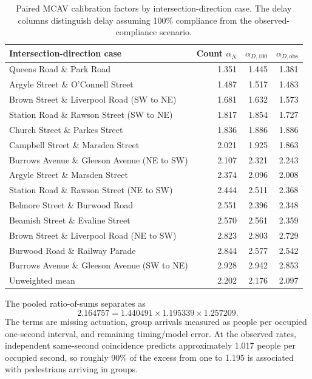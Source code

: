 \documentclass[11pt]{article}
\begin{document}
\begin{table}[htbp]
\centering
\caption{Paired MCAV calibration factors by intersection-direction case. The delay columns distinguish delay assuming 100\% compliance from the observed-compliance scenario.}
\label{tab:mcav-alpha-cases}
\footnotesize
\begin{tabular}{@{}lrrr@{}}
\toprule
Intersection-direction case & Count \(\alpha_N\) & \(\alpha_{D,100}\) & \(\alpha_{D,\mathrm{obs}}\) \\
\midrule
Queens Road \& Park Road & 1.351 & 1.445 & 1.381 \\
Argyle Street \& O'Connell Street & 1.487 & 1.517 & 1.483 \\
Brown Street \& Liverpool Road (SW to NE) & 1.681 & 1.632 & 1.573 \\
Station Road \& Rawson Street (SW to NE) & 1.817 & 1.854 & 1.727 \\
Church Street \& Parkes Street & 1.836 & 1.886 & 1.886 \\
Campbell Street \& Marsden Street & 2.021 & 1.925 & 1.863 \\
Burrows Avenue \& Gleeson Avenue (NE to SW) & 2.107 & 2.321 & 2.243 \\
Argyle Street \& Marsden Street & 2.374 & 2.096 & 2.008 \\
Station Road \& Rawson Street (NE to SW) & 2.444 & 2.511 & 2.368 \\
Belmore Street \& Burwood Road & 2.551 & 2.396 & 2.348 \\
Beamish Street \& Evaline Street & 2.570 & 2.561 & 2.359 \\
Brown Street \& Liverpool Road (NE to SW) & 2.823 & 2.803 & 2.729 \\
Burwood Road \& Railway Parade & 2.844 & 2.577 & 2.542 \\
Burrows Avenue \& Gleeson Avenue (SW to NE) & 2.928 & 2.942 & 2.853 \\
\midrule
Unweighted mean & 2.202 & 2.176 & 2.097 \\
\bottomrule
\end{tabular}
\end{table}

The pooled ratio-of-sums separates as
\begin{equation}
2.164757=1.440491\times1.195339\times1.257209.
\end{equation}
The terms are missing actuation, group arrivals measured as people per occupied one-second interval, and remaining timing/model error. At the observed rates, independent same-second coincidence predicts approximately 1.017 people per occupied second, so roughly 90\% of the excess from one to 1.195 is associated with pedestrians arriving in groups.
\end{document}
